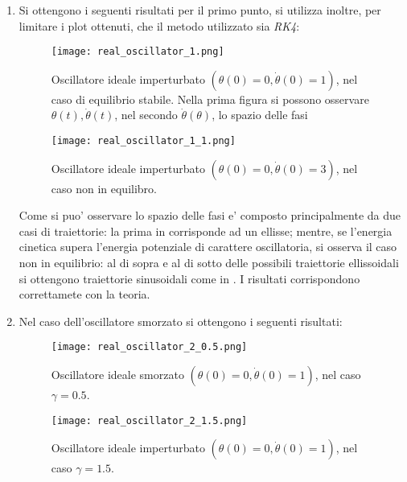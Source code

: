 \begin{enumerate}

	\item Si ottengono i seguenti risultati per il primo punto, si utilizza inoltre, per limitare i plot ottenuti, che il metodo utilizzato sia \textit{RK4}:

	      \begin{figure} [H]
		      \centering
		      \texttt{[image: real\_oscillator\_1.png]}
		      \caption{Oscillatore ideale imperturbato $(\theta(0)=0, \dot{\theta}(0)=1)$, nel caso di equilibrio stabile. Nella prima figura si possono osservare $\theta(t), \dot{\theta}(t)$, nel secondo $\dot{\theta}(\theta)$, lo spazio delle fasi}
	      \end{figure}

	      \begin{figure} [H]
		      \centering
		      \texttt{[image: real\_oscillator\_1\_1.png]}
		      \caption{Oscillatore ideale imperturbato $(\theta(0)=0, \dot{\theta}(0)=3)$, nel caso non in equilibro.}
	      \end{figure}

	      Come si puo' osservare lo spazio delle fasi e' composto principalmente da due
	      casi di traiettorie: la prima in  corrisponde ad un ellisse; mentre, se l'energia cinetica supera l'energia potenziale di carattere oscillatoria, si osserva il caso non in equilibrio: al di sopra e al di sotto delle possibili traiettorie ellissoidali si ottengono traiettorie sinusoidali come in . I risultati corrispondono correttamete con la teoria.

	\item Nel caso dell'oscillatore smorzato si ottengono i seguenti risultati:

	      \begin{figure} [H]
		      \centering
		      \texttt{[image: real\_oscillator\_2\_0.5.png]}
		      \caption{Oscillatore ideale smorzato $(\theta(0)=0, \dot{\theta}(0)=1)$, nel caso $\gamma=0.5$.}
	      \end{figure}

	      \begin{figure} [H]
		      \centering
		      \texttt{[image: real\_oscillator\_2\_1.5.png]}
		      \caption{Oscillatore ideale imperturbato $(\theta(0)=0, \dot{\theta}(0)=1)$, nel caso $\gamma=1.5$.}
	      \end{figure}


\end{enumerate}
